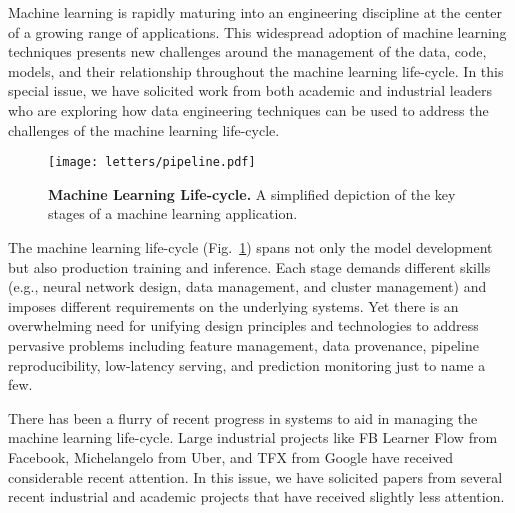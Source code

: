\documentclass[11pt]{article}
\begin{document}
Machine learning is rapidly maturing into an engineering discipline at the center of a growing range of applications.
This widespread adoption of machine learning techniques presents new challenges around the management of the data, code, models, and their relationship throughout the machine learning life-cycle.
In this special issue, 
we have solicited work from both academic and industrial leaders 
who are exploring how data engineering techniques can be used to address the challenges of the machine learning life-cycle.




\begin{figure}[h]
\centering
\texttt{[image: letters/pipeline.pdf]}
\caption{\small \textbf{Machine Learning Life-cycle.} A simplified depiction of the key stages of a machine learning application.}
\label{fig:mllc}
\end{figure}


The machine learning life-cycle (Fig.~\ref{fig:mllc}) spans not only the model development but also production training and inference.
Each stage demands different skills (e.g., neural network design, data management, and cluster management) and imposes different requirements on the underlying systems.
Yet there is an overwhelming need for unifying design principles and technologies to address pervasive problems including feature management, data provenance, pipeline reproducibility, low-latency serving, and prediction monitoring just to name a few.


There has been a flurry of recent progress in systems to aid in managing the machine learning life-cycle.  
Large industrial projects like 
FB Learner Flow 
from Facebook, 
Michelangelo 
from Uber, and 
TFX 
from Google have received considerable recent attention.  
In this issue, we have solicited papers from several recent industrial and academic projects that have received slightly less attention.
\end{document}
